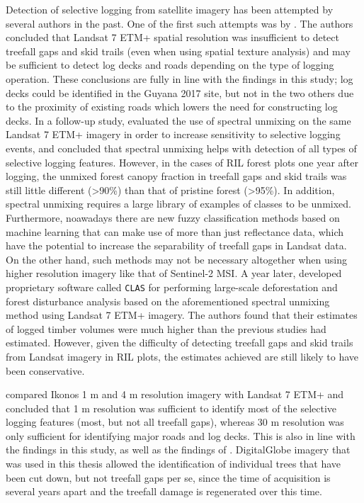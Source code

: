 \documentclass[a4paper,12pt]{scrbook}
\begin{document}
Detection of selective logging from satellite imagery has been attempted by several authors in the past. One of the first such attempts was by \citet{asner_remote_2002}. The authors concluded that Landsat 7 \ac{ETM+} spatial resolution was insufficient to detect treefall gaps and skid trails (even when using spatial texture analysis) and may be sufficient to detect log decks and roads depending on the type of logging operation. These conclusions are fully in line with the findings in this study; log decks could be identified in the Guyana 2017 site, but not in the two others due to the proximity of existing roads which lowers the need for constructing log decks. In a follow-up study, \citet{asner_canopy_2004} evaluated the use of spectral unmixing on the same Landsat 7 \ac{ETM+} imagery in order to increase sensitivity to selective logging events, and concluded that spectral unmixing helps with detection of all types of selective logging features. However, in the cases of \ac{RIL} forest plots one year after logging, the unmixed forest canopy fraction in treefall gaps and skid trails was still little different (>90\%) than that of pristine forest (>95\%). In addition, spectral unmixing requires a large library of examples of classes to be unmixed. Furthermore, noawadays there are new fuzzy classification methods based on machine learning that can make use of more than just reflectance data, which have the potential to increase the separability of treefall gaps in Landsat data. On the other hand, such methods may not be necessary altogether when using higher resolution imagery like that of Sentinel-2 \ac{MSI}. A year later, \citet{asner_selective_2005} developed proprietary software called \texttt{CLAS} for performing large-scale deforestation and forest disturbance analysis based on the aforementioned spectral unmixing method using Landsat 7 \ac{ETM+} imagery. The authors found that their estimates of logged timber volumes were much higher than the previous studies had estimated. However, given the difficulty of detecting treefall gaps and skid trails from Landsat imagery in \ac{RIL} plots, the estimates achieved are still likely to have been conservative.

\citet{read_spatial_2003} compared Ikonos 1 m and 4 m resolution imagery with Landsat 7 \ac{ETM+} and concluded that 1 m resolution was sufficient to identify most of the selective logging features (most, but not all treefall gaps), whereas 30 m resolution was only sufficient for identifying major roads and log decks. This is also in line with the findings in this study, as well as the findings of \citet{asner_remote_2002}. DigitalGlobe imagery that was used in this thesis allowed the identification of individual trees that have been cut down, but not treefall gaps per se, since the time of acquisition is several years apart and the treefall damage is regenerated over this time.
\end{document}
